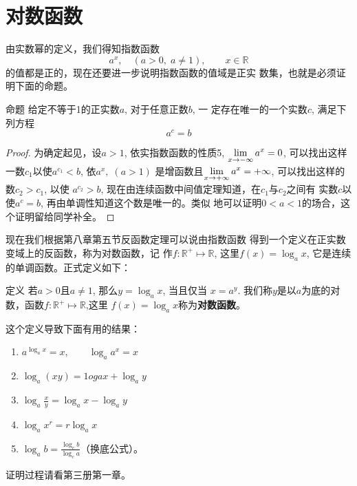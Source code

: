 \section{对数函数}

由实数幂的定义，我们得知指数函数
\[a^x,\quad (a>0,\;a\ne 1),\qquad x\in\mathbb{R}\]
的值都是正的，现在还要进一步说明指数函数的值域是正实
数集，也就是必须证明下面的命题。

\begin{blk}{命题}
   给定不等于1的正实数$a$, 对于任意正数$b$, 一
定存在唯一的一个实数$c$, 满足下列方程
$$a^c=b$$
\end{blk}

\begin{proof}
  为确定起见，设$a>1$, 依实指数函数的性质5,
$\displaystyle\lim_{x\to-\infty}a^x=0$, 可以找出这样一数$c_1$以使$a^{c_1}<b$, 依$a^x,\;(a>1)$
是增函数且$\displaystyle\lim_{x\to+\infty}a^x=+\infty$, 可以找出这样的数$c_2>c_1$, 以使
$a^{c_2}>b$, 现在由连续函数中间值定理知道，在$c_1$与$c_2$之间有
实数$c$以使$a^c=b$, 再由单调性知道这个数是唯一的。类似
地可以证明$0<a<1$的场合，这个证明留给同学补全。
\end{proof}


现在我们根据第八章第五节反函数定理可以说由指数函数
得到一个定义在正实数变域上的反函数，称为对数函数，记
作$f:\mathbb{R}^+\mapsto \mathbb{R}$, 这里$f(x)=\log_a x$, 它是连续的单调函数。正式定义如下：

\begin{blk}{定义}
   若$a>0$且$a\ne 1$, 那么$y=\log_a x$, 当且仅当
$x=a^y$. 我们称$y$是以$a$为底的对数，函数$f:\mathbb{R}^+\mapsto \mathbb{R}$,这里
$f(x)=\log_a x$称为\textbf{对数函数}。
\end{blk}

这个定义导致下面有用的结果：
\begin{enumerate}
  \item $a^{\log_a x}=x,\qquad \log_a a^x=x$
  \item $\log_a (xy)=1ogax+\log_a y$
  \item $\log_a \frac{x}{y}=\log_a x-\log_a y$
  \item $\log_a x^r=r\log_a x$
  \item $\log_a b=\frac{\log_c b}{\log_c a}$（换底公式）。
\end{enumerate}
证明过程请看第三册第一章。

